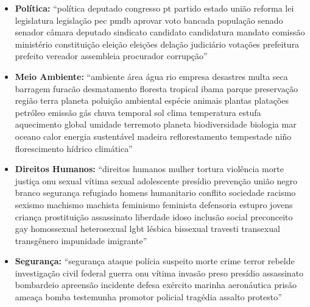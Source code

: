 \begin{apendicesenv}
\begin{itemize}
    \item \textbf{Política:} ``política deputado congresso pt partido estado união reforma lei legislatura legislação pec pmdb aprovar voto bancada população senado senador câmara deputado sindicato candidato candidatura mandato comissão ministério constituição eleição eleições delação judiciário votações prefeitura prefeito vereador assembleia procurador corrupção''
    \item \textbf{Meio Ambiente:} ``ambiente área água rio empresa desastres multa seca barragem furacão desmatamento floresta tropical ibama parque preservação região terra planeta poluição ambiental espécie animais plantas platações petróleo emissão gás chuva temporal sol clima temperatura estufa aquecimento global umidade terremoto planeta biodiversidade biologia mar oceano calor energia sustentável madeira reflorestamento tempestade niño florescimento hídrico climática''
    \item \textbf{Direitos Humanos:} ``direitos humanos mulher tortura violência morte justiça onu sexual vítima sexual adolescente presídio prevenção união negro branco segurança refugiado homens humanitario conflito sociedade racismo sexismo machismo machista feminismo feminista defensoria estupro jovens criança prostituição assassinato liberdade idoso inclusão social preconceito gay homossexual heterosexual lgbt lésbica bissexual travesti transexual transgênero impunidade imigrante''
    \item \textbf{Segurança:} ``segurança ataque polícia suspeito morte crime terror rebelde investigação civil federal guerra onu vítima invasão preso presídio assassinato bombardeio apreensão incidente defesa exército marinha aeronáutica prisão ameaça bomba testemunha promotor policial tragédia assalto protesto''
\end{itemize}


\end{apendicesenv}
